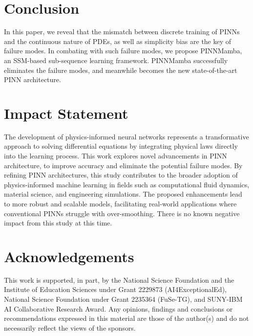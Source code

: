 \documentclass{article}
\theoremstyle{plain}
\theoremstyle{definition}
\theoremstyle{remark}
\begin{document}
%

%
\vspace{-3mm}
\section{Conclusion}
In this paper, we reveal that the mismatch between discrete training of PINNs and the continuous nature of PDEs, as well as simplicity bias are the key of failure modes. 
    In combating with such failure modes, we propose PINNMamba, an SSM-based sub-sequence learning framework. 
    PINNMamba successfully eliminates the failure modes, and meanwhile becomes the new state-of-the-art PINN architecture.
    
\section*{Impact Statement}

The development of physics-informed neural networks represents a transformative approach to solving differential equations by integrating physical laws directly into the learning process. 
    This work explores novel advancements in PINN architecture, to improve accuracy and eliminate the potential failure modes. 
    By refining PINN architectures, this study contributes to the broader adoption of physics-informed machine learning in fields such as computational fluid dynamics, material science, and engineering simulations. 
        The proposed enhancements lead to more robust and scalable models, facilitating real-world applications where conventional PINNs struggle with over-smoothing. There is no known negative impact from this study at this time.

\section*{Acknowledgements}

This work is supported, in part, by the National Science Foundation and the Institute of Education Sciences under Grant 2229873 (AI4ExceptionalEd), National Science Foundation under Grant 2235364 (FuSe-TG), and SUNY-IBM AI Collaborative Research Award. Any opinions, findings and conclusions or recommendations expressed in this material are those of the author(s) and do not necessarily reflect the views of the sponsors.







\end{document}

